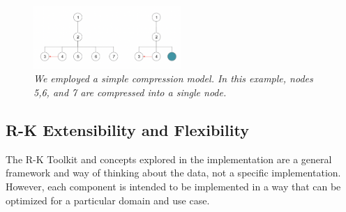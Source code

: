 \begin{figure}[H]
	\centering
        \includegraphics[width=0.5\textwidth]{images/compression_example2.png}
	\caption{\textit{We employed a simple compression model. In this example, nodes 5,6, and 7 are compressed into a single node.}}
	\label{fig:linker}
\end{figure}


\subsection{R-K Extensibility and Flexibility}

The R-K Toolkit and concepts explored in the implementation are a general framework and way of thinking about the data, not a specific implementation. However, each component is intended to be implemented in a way that can be optimized for a particular domain and use case.
